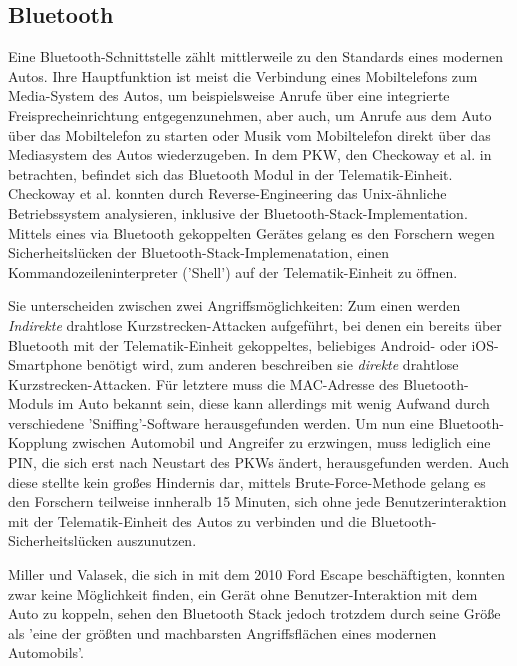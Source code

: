 \documentclass[
    fontsize=12pt,
    headings=small,
    parskip=half,           %
    bibliography=totoc,9
    numbers=noenddot,       %
    open=any,               %
    ]{scrreprt}
\begin{document}
\subsection{Bluetooth}
Eine Bluetooth-Schnittstelle zählt mittlerweile zu den Standards eines modernen Autos. Ihre Hauptfunktion ist meist die Verbindung eines Mobiltelefons zum Media-System des Autos, um beispielsweise Anrufe über eine integrierte Freisprecheinrichtung entgegenzunehmen, aber auch, um Anrufe aus dem Auto über das Mobiltelefon zu starten oder Musik vom Mobiltelefon direkt über das Mediasystem des Autos wiederzugeben.
In dem PKW, den Checkoway et al. in \cite{CMK11} betrachten, befindet sich das Bluetooth Modul in der Telematik-Einheit. Checkoway et al. konnten durch Reverse-Engineering das Unix-ähnliche Betriebssystem analysieren, inklusive der Bluetooth-Stack-Implementation. Mittels eines via Bluetooth gekoppelten Gerätes gelang es den Forschern wegen Sicherheitslücken der Bluetooth-Stack-Implemenatation, einen Kommandozeileninterpreter ('Shell') auf der Telematik-Einheit zu öffnen. \par
Sie unterscheiden zwischen zwei Angriffsmöglichkeiten: Zum einen werden \textit{Indirekte} drahtlose Kurzstrecken-Attacken aufgeführt, bei denen ein bereits über Bluetooth mit der Telematik-Einheit gekoppeltes, beliebiges Android- oder iOS-Smartphone benötigt wird, zum anderen beschreiben sie \textit{direkte} drahtlose Kurzstrecken-Attacken. Für letztere muss die MAC-Adresse des Bluetooth-Moduls im Auto bekannt sein, diese kann allerdings mit wenig Aufwand durch verschiedene 'Sniffing'-Software herausgefunden werden. Um nun eine Bluetooth-Kopplung zwischen Automobil und Angreifer zu erzwingen, muss lediglich eine PIN, die sich erst nach Neustart des PKWs ändert, herausgefunden werden. Auch diese stellte kein großes Hindernis dar, mittels Brute-Force-Methode gelang es den Forschern teilweise innheralb 15 Minuten, sich ohne jede Benutzerinteraktion mit der Telematik-Einheit des Autos zu verbinden und die Bluetooth-Sicherheitslücken auszunutzen.\par
Miller und Valasek, die sich in \cite{MiV14} mit dem 2010 Ford Escape beschäftigten, konnten zwar keine Möglichkeit finden, ein Gerät ohne Benutzer-Interaktion mit dem Auto zu koppeln, sehen den Bluetooth Stack jedoch trotzdem durch seine Größe als 'eine der größten und machbarsten Angriffsflächen eines modernen Automobils'.
\end{document}
